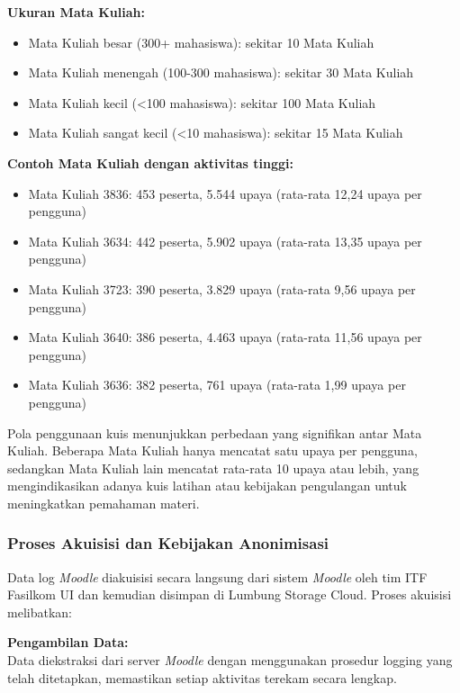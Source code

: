 \textbf{Ukuran Mata Kuliah:}
\begin{itemize}
    \item Mata Kuliah besar (300+ mahasiswa): sekitar 10 Mata Kuliah
    \item Mata Kuliah menengah (100-300 mahasiswa): sekitar 30 Mata Kuliah
    \item Mata Kuliah kecil (<100 mahasiswa): sekitar 100 Mata Kuliah
    \item Mata Kuliah sangat kecil (<10 mahasiswa): sekitar 15 Mata Kuliah
\end{itemize}

\textbf{Contoh Mata Kuliah dengan aktivitas tinggi:}
\begin{itemize}
    \item Mata Kuliah 3836: 453 peserta, 5.544 upaya (rata-rata 12,24 upaya per pengguna)
    \item Mata Kuliah 3634: 442 peserta, 5.902 upaya (rata-rata 13,35 upaya per pengguna)
    \item Mata Kuliah 3723: 390 peserta, 3.829 upaya (rata-rata 9,56 upaya per pengguna)
    \item Mata Kuliah 3640: 386 peserta, 4.463 upaya (rata-rata 11,56 upaya per pengguna)
    \item Mata Kuliah 3636: 382 peserta, 761 upaya (rata-rata 1,99 upaya per pengguna)
\end{itemize}

Pola penggunaan kuis menunjukkan perbedaan yang signifikan antar Mata Kuliah. Beberapa Mata Kuliah hanya mencatat satu upaya per pengguna, sedangkan Mata Kuliah lain mencatat rata-rata 10 upaya atau lebih, yang mengindikasikan adanya kuis latihan atau kebijakan pengulangan untuk meningkatkan pemahaman materi.

\subsubsection{Proses Akuisisi dan Kebijakan Anonimisasi}
\label{sec:prosesAkuisisiKebijakanAnonimisasi}
Data log \textit{Moodle} diakuisisi secara langsung dari sistem \textit{Moodle} oleh tim ITF Fasilkom UI dan kemudian disimpan di Lumbung Storage Cloud. Proses akuisisi melibatkan:

\textbf{Pengambilan Data:} \\
Data diekstraksi dari server \textit{Moodle} dengan menggunakan prosedur logging yang telah ditetapkan, memastikan setiap aktivitas terekam secara lengkap.

